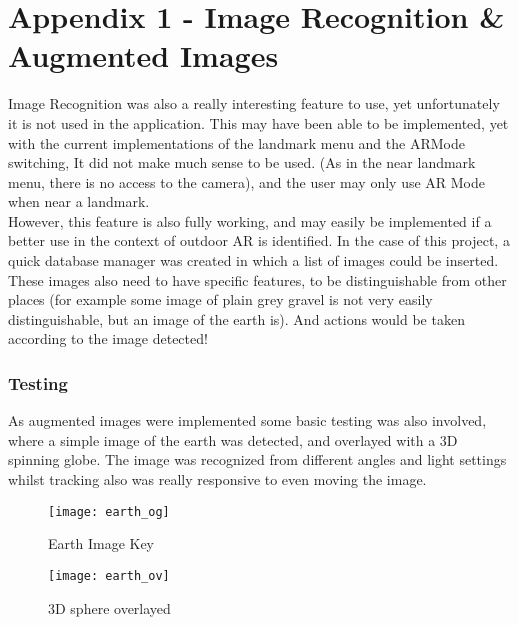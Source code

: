 \pagebreak
 \section*{Appendix 1 - Image Recognition \& Augmented Images}
 Image Recognition was also a really interesting feature to use, yet unfortunately it is not used in the application. This may have been able to be implemented, yet with the current implementations 
 of the landmark menu and the ARMode switching, It did not make much sense to be used. (As in the near landmark menu, there is no access to the camera), and the user may only use AR Mode when near a landmark.\\
 However, this feature is also fully working, and may easily be implemented if a better use in the context of outdoor AR is identified. 
 In the case of this project, a quick database manager was created in which a list of images could
  be inserted. These images also need to have specific features, to be distinguishable from other places (for example some image of plain grey gravel is not very easily distinguishable, 
  but an image of the earth is). And actions would be taken according to the image detected!
  \subsubsection*{Testing}
As augmented images were implemented some basic testing was also involved, where a simple image of the earth was detected, and overlayed with a 3D spinning globe. 
The image was recognized from different angles and light settings whilst tracking also was really responsive to even moving the image.
\begin{figure}[!htb]
        \texttt{[image: earth\_og]}
            \caption{Earth Image Key}
            \label{fig:earth_og}
    \endminipage\hfill
        \texttt{[image: earth\_ov]}
        \caption{3D sphere overlayed}
        \label{fig:earth_ov}
    \endminipage
    \end{figure}